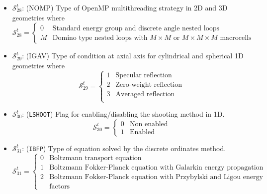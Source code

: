 \begin{itemize}
\item $\mathcal{S}^{t}_{28}$: (NOMP) Type of OpenMP multithreading strategy in 2D and 3D geometries where
\begin{displaymath}
\mathcal{S}^{t}_{28} = \left\{
\begin{array}{rl}
 0 & \textrm{Standard energy group and discrete angle nested loops}\\
 M & \textrm{Domino type nested loops with $M\times M$ or $M \times M \times M$ macrocells}
\end{array} \right.
\end{displaymath}

\item $\mathcal{S}^{t}_{29}$: (IGAV) Type of condition at axial axis for cylindrical and spherical 1D geometries where
\begin{displaymath}
\mathcal{S}^{t}_{29} = \left\{
\begin{array}{rl}
 1 & \textrm{Specular reflection}\\
 2 & \textrm{Zero-weight reflection}\\
 3 & \textrm{Averaged reflection}\\
\end{array} \right.
\end{displaymath}

\item $\mathcal{S}^{t}_{30}$: ({\tt LSHOOT}) Flag for enabling/disabling the shooting method in 1D.
\begin{displaymath}
\mathcal{S}^{t}_{30} = \left\{
\begin{array}{rl}
 0 & \textrm{Non enabled} \\
 1 & \textrm{Enabled}
\end{array} \right.
\end{displaymath}

\item $\mathcal{S}^{t}_{31}$: ({\tt IBFP}) Type of equation solved by the discrete ordinates method.
\begin{displaymath}
\mathcal{S}^{t}_{31} = \left\{
\begin{array}{rl}
 0 & \textrm{Boltzmann transport equation} \\
 1 & \textrm{Boltzmann Fokker-Planck equation with Galarkin energy propagation factors} \\
 2 & \textrm{Boltzmann Fokker-Planck equation with Przybylski and Ligou energy propagation} \\
  & \textrm{factors}
\end{array} \right.
\end{displaymath}


\end{itemize}
